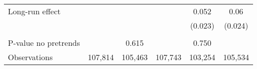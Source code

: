 {\begin{tabular}{l*{5}{c}}
Long-run effect&                  &                  &                  &0.052\sym{**}         &0.06\sym{**}         \\
          &                  &                  &                  &  (0.023)         &  (0.024)         \\
\hline    &                  &                  &                  &                  &                  \\
P-value no pretrends&                  &    0.615         &                  &    0.750         &                  \\
Observations&  107,814         &  105,463         &  107,743         &  103,254         &  105,534         \\
\hline\hline
\end{tabular}
}
